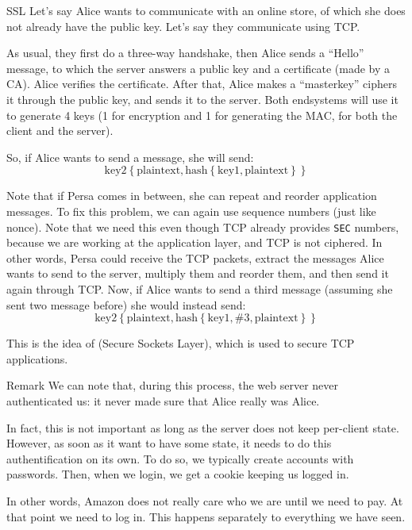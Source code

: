 \documentclass[a4paper]{article}
\begin{document}
\begin{parag}{SSL}
    Let's say Alice wants to communicate with an online store, of which she does not already have the public key. Let's say they communicate using TCP.

    As usual, they first do a three-way handshake, then Alice sends a ``Hello'' message, to which the server answers a public key and a certificate (made by a CA). Alice verifies the certificate. After that, Alice makes a ``masterkey'' ciphers it through the public key, and sends it to the server. Both endsystems will use it to generate 4 keys (1 for encryption and 1 for generating the MAC, for both the client and the server).

    So, if Alice wants to send a message, she will send: 
    \[\text{key2}\left\{\text{plaintext}, \text{hash}\left\{\text{key1}, \text{plaintext}\right\}\right\}\]

    Note that if Persa comes in between, she can repeat and reorder application messages. To fix this problem, we can again use sequence numbers (just like nonce). Note that we need this even though TCP already provides \texttt{SEC} numbers, because we are working at the application layer, and TCP is not ciphered. In other words, Persa could receive the TCP packets, extract the messages Alice wants to send to the server, multiply them and reorder them, and then send it again through TCP. Now, if Alice wants to send a third message (assuming she sent two message before) she would instead send:
    \[\text{key2}\left\{\text{plaintext}, \text{hash}\left\{\text{key1}, \#3, \text{plaintext}\right\}\right\}\]

    This is the idea of  (Secure Sockets Layer), which is used to secure TCP applications.

    \begin{subparag}{Remark}
        We can note that, during this process, the web server never authenticated us: it never made sure that Alice really was Alice.

        In fact, this is not important as long as the server does not keep per-client state. However, as soon as it want to have some state, it needs to do this authentification on its own. To do so, we typically create accounts with passwords. Then, when we login, we get a cookie keeping us logged in.

        In other words, Amazon does not really care who we are until we need to pay. At that point we need to log in. This happens separately to everything we have seen.
    \end{subparag}
\end{parag}
\end{document}

